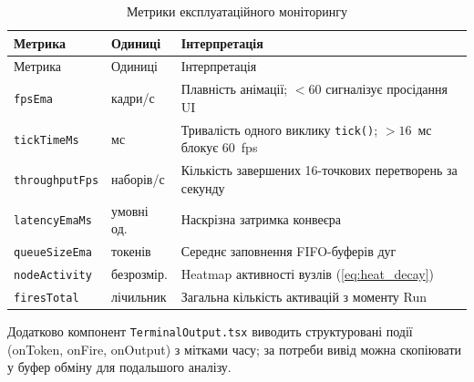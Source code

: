 \begin{longtable}[]{@{}
  >{\raggedright\arraybackslash}p{}
  >{\raggedright\arraybackslash}p{}
  >{\raggedright\arraybackslash}p{}@{}}
\caption{\protect{}\label{tab:monitoring_metrics}{}Метрики
експлуатаційного моніторингу}\tabularnewline
\toprule\noalign{}
\begin{minipage}[b]{\linewidth}\raggedright
Метрика
\end{minipage} & \begin{minipage}[b]{\linewidth}\raggedright
Одиниці
\end{minipage} & \begin{minipage}[b]{\linewidth}\raggedright
Інтерпретація
\end{minipage} \\
\midrule\noalign{}
\endfirsthead
\toprule\noalign{}
\begin{minipage}[b]{\linewidth}\raggedright
Метрика
\end{minipage} & \begin{minipage}[b]{\linewidth}\raggedright
Одиниці
\end{minipage} & \begin{minipage}[b]{\linewidth}\raggedright
Інтерпретація
\end{minipage} \\
\midrule\noalign{}
\endhead
\bottomrule\noalign{}
\endlastfoot
\texttt{fpsEma} & кадри/с & Плавність анімації; \(< 60\) сигналізує
просідання UI \\
\texttt{tickTimeMs} & мс & Тривалість одного виклику \texttt{tick()};
\(> 16\)~мс блокує 60~fps \\
\texttt{throughputFps} & наборів/с & Кількість завершених 16-точкових
перетворень за секунду \\
\texttt{latencyEmaMs} & умовні од. & Наскрізна затримка конвеєра \\
\texttt{queueSizeEma} & токенів & Середнє заповнення FIFO-буферів дуг \\
\texttt{nodeActivity} & безрозмір. & Heatmap активності вузлів
(\hyperref[eq:heat_decay]{{[}eq:heat\_decay{]}}) \\
\texttt{firesTotal} & лічильник & Загальна кількість активацій з моменту
Run \\
\end{longtable}

Додатково компонент \texttt{TerminalOutput.tsx} виводить структуровані
події (onToken, onFire, onOutput) з мітками часу; за потреби вивід можна
скопіювати у буфер обміну для подальшого аналізу.

